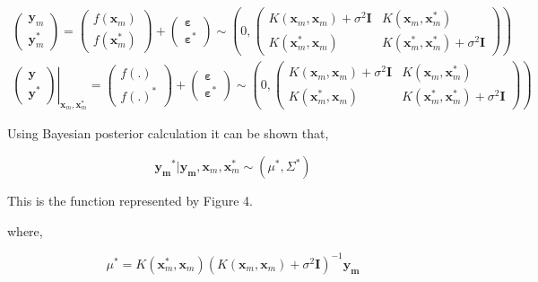 \documentclass[english]{tktltiki}
\begin{document}
\begin{eqnarray}
\begin{pmatrix}
\mathbf{y}_m \\
\mathbf{y}_m^*
\end{pmatrix}
= %
\begin{pmatrix}
f(\mathbf{x}_m) \\
f(\mathbf{x}_m^*)
\end{pmatrix}
+%
\begin{pmatrix}
\mathbf{\varepsilon} \\
\mathbf{\varepsilon^*}
\end{pmatrix}
\sim \left( %
0, %
\begin{pmatrix}
K(\mathbf{x}_m, \mathbf{x}_m) + \sigma^2 \mathbf{I} & K(\mathbf{x}_m, \mathbf{x}_m^*) \\
K(\mathbf{x}_m^*, \mathbf{x}_m) & K(\mathbf{x}_m^*, \mathbf{x}_m^*) + \sigma^2 \mathbf{I}
\end{pmatrix}\right) \nonumber \\
\left.
\begin{pmatrix}
\mathbf{y} \\
\mathbf{y}^*
\end{pmatrix}
\right\vert_{\mathbf{x}_m, \mathbf{x}_m^*}
= %
\begin{pmatrix}
f(.) \\
f(.)^*
\end{pmatrix}
+%
\begin{pmatrix}
\mathbf{\varepsilon} \\
\mathbf{\varepsilon^*}
\end{pmatrix}
\sim \left( %
0, %
\begin{pmatrix}
K(\mathbf{x}_m, \mathbf{x}_m) + \sigma^2 \mathbf{I} & K(\mathbf{x}_m, \mathbf{x}_m^*) \\
K(\mathbf{x}_m^*, \mathbf{x}_m) & K(\mathbf{x}_m^*, \mathbf{x}_m^*) + \sigma^2 \mathbf{I}
\end{pmatrix}\right)
\end{eqnarray}

Using Bayesian posterior calculation it can be shown that,

\begin{equation}
\mathbf{y_m}^* | \mathbf{y_m}, \mathbf{x}_m, \mathbf{x}_m^* \sim (\mu^*, \Sigma^*)
\end{equation}

This is the function represented by Figure 4.

where,

\begin{equation}
\mu^* = K(\mathbf{x}_m^*, \mathbf{x}_m)(K(\mathbf{x}_m, \mathbf{x}_m) + \sigma^2 \mathbf{I})^{-1}\mathbf{y_m}
\end{equation}
\end{document}
